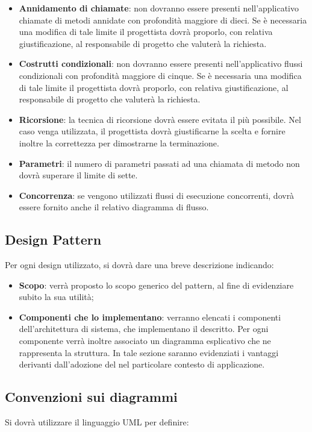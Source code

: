 {\begin{itemize}
\item \textbf{Annidamento di chiamate}: non dovranno essere presenti nell'applicativo chiamate di metodi annidate con profondità maggiore di dieci. Se è necessaria una modifica di tale limite il progettista dovrà proporlo, con relativa giustificazione, al responsabile di progetto che valuterà la richiesta.
\item \textbf{Costrutti condizionali}: non dovranno essere presenti nell'applicativo flussi condizionali con profondità maggiore di cinque. Se è necessaria una modifica di tale limite il progettista dovrà proporlo, con relativa giustificazione, al responsabile di progetto che valuterà la richiesta.
\item \textbf{Ricorsione}: la tecnica di ricorsione dovrà essere evitata il più possibile. Nel caso venga utilizzata, il progettista dovrà giustificarne la scelta e fornire inoltre la correttezza per dimostrarne la terminazione.
\item \textbf{Parametri}: il numero di parametri passati ad una chiamata di metodo non dovrà superare il limite di sette.
\item \textbf{Concorrenza}: se vengono utilizzati flussi di esecuzione concorrenti, dovrà essere fornito anche il relativo diagramma di flusso.
\end{itemize}

\subsection{Design Pattern}
\label{sec:design_patterns}
Per ogni design  utilizzato, si dovrà dare una breve descrizione indicando:
\begin{itemize}
\item \textbf{Scopo}: verrà proposto lo scopo generico del pattern, al fine di evidenziare subito la sua utilità;
\item \textbf{Componenti che lo implementano}: verranno elencati i componenti dell'architettura di sistema, che implementano il  descritto. Per ogni componente verrà inoltre associato un diagramma esplicativo che ne rappresenta la struttura. In tale sezione saranno evidenziati i vantaggi derivanti dall'adozione del  nel particolare contesto di applicazione.
\end{itemize}

\subsection{Convenzioni sui diagrammi}
Si dovrà utilizzare il linguaggio UML per definire:
\begin{itemize}


\end{itemize}}
